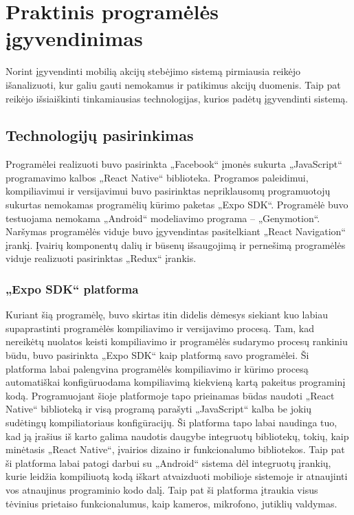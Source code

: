 \documentclass[a4paper,12pt,fleqn]{article}
\begin{document}
\newpage
\section{Praktinis programėlės įgyvendinimas}
Norint įgyvendinti mobilią akcijų stebėjimo sistemą pirmiausia reikėjo išanalizuoti, kur galiu gauti nemokamus ir patikimus akcijų duomenis. Taip pat reikėjo išsiaiškinti tinkamiausias technologijas, kurios padėtų įgyvendinti sistemą.
\subsection{Technologijų pasirinkimas}
Programėlei realizuoti buvo pasirinkta „Facebook“ įmonės sukurta „JavaScript“ programavimo kalbos „React Native“ biblioteka. Programos paleidimui, kompiliavimui ir versijavimui buvo pasirinktas nepriklausomų programuotojų sukurtas nemokamas programėlių kūrimo paketas „Expo SDK“. Programėlė buvo testuojama nemokama „Android“ modeliavimo programa – „Genymotion“. Naršymas programėlės viduje buvo įgyvendintas pasitelkiant „React Navigation“ įrankį. Įvairių komponentų dalių ir būsenų išsaugojimą ir pernešimą programėlės viduje realizuoti pasirinktas „Redux“ įrankis.
\subsubsection{„Expo SDK“ platforma}
Kuriant šią programėlę, buvo skirtas itin didelis dėmesys siekiant kuo labiau supaprastinti programėlės kompiliavimo ir versijavimo procesą. Tam, kad nereikėtų nuolatos keisti kompiliavimo ir programėlės sudarymo procesų rankiniu būdu, buvo pasirinkta „Expo SDK“ kaip platformą savo programėlei. Ši platforma labai palengvina programėlės kompiliavimo ir kūrimo procesą automatiškai konfigūruodama kompiliavimą kiekvieną kartą pakeitus programinį kodą. Programuojant šioje platformoje tapo prieinamas būdas naudoti „React Native“ biblioteką ir visą programą parašyti „JavaScript“ kalba be jokių sudėtingų kompiliatoriaus konfigūracijų. Ši platforma tapo labai naudinga tuo, kad ją įrašius iš karto galima naudotis daugybe integruotų bibliotekų, tokių, kaip minėtasis „React Native“, įvairios dizaino ir funkcionalumo bibliotekos. Taip pat ši platforma labai patogi darbui su „Android“ sistema dėl integruotų įrankių, kurie leidžia kompiliuotą kodą iškart atvaizduoti mobilioje sistemoje ir atnaujinti vos atnaujinus programinio kodo dalį. Taip pat ši platforma įtraukia visus tėvinius prietaiso funkcionalumus, kaip kameros, mikrofono, jutiklių valdymas.
\end{document}
